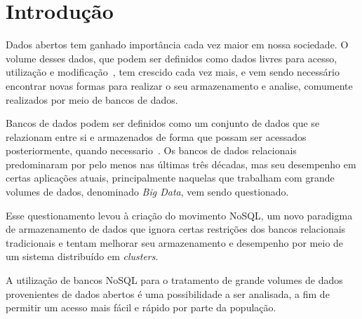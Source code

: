 \chapter{Introdução}

Dados abertos tem ganhado importância cada vez maior em nossa sociedade. O volume desses dados, que podem ser definidos como dados livres para acesso, utilização e modificação~\cite{opendefinition}, tem crescido cada vez mais, e vem sendo necessário encontrar novas formas para realizar o seu armazenamento e analise, comumente realizados por meio de bancos de dados.

Bancos de dados podem ser definidos como um conjunto de dados que se relazionam entre si e armazenados de forma que possam ser acessados posteriormente, quando necessario~\cite{leavitt2010nosql}.
Os bancos de dados relacionais predominaram por pelo menos nas últimas três décadas, mas seu desempenho em certas aplicações atuais, principalmente naquelas que trabalham com grande volumes de dados, denominado \emph{Big Data}, vem sendo questionado. 

Esse questionamento levou à criação do movimento NoSQL, um novo paradigma de armazenamento de dados que ignora certas restrições dos bancos relacionais tradicionais e tentam melhorar seu armazenamento e desempenho por meio de um sistema distribuído em \emph{clusters}.

A utilização de bancos NoSQL para o tratamento de grande volumes de dados provenientes de dados abertos é uma possibilidade a ser analisada, a fim de permitir um acesso mais fácil e rápido por parte da população. 








